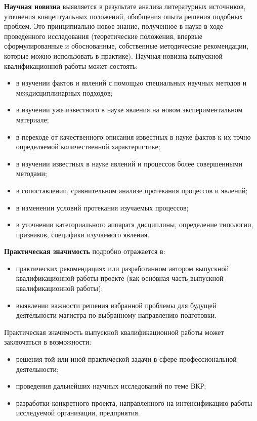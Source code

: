 \textbf{Научная новизна} выявляется в результате анализа литературных источников, уточнения концептуальных положений, обобщения опыта решения подобных проблем. Это принципиально новое знание, полученное в науке в ходе проведенного исследования (теоретические положения, впервые сформулированные и обоснованные, собственные методические рекомендации, которые можно использовать в практике).
Научная новизна выпускной квалификационной работы может состоять: 
\begin{itemize}
	\item в изучении фактов и явлений с помощью специальных научных методов и междисциплинарных подходов;
    \item в изучении уже известного в науке явления на новом экспериментальном материале;
	\item в переходе от качественного описания известных в науке фактов к их точно определяемой количественной характеристике;
	\item в изучении известных в науке явлений и процессов более совершенными методами;
	\item в сопоставлении, сравнительном анализе протекания процессов и явлений;
	\item в изменении условий протекания изучаемых процессов;
	\item в уточнении категориального аппарата дисциплины, определение типологии, признаков, специфики изучаемого явления.
\end{itemize}

\textbf{Практическая значимость} подробно отражается в:
\begin{itemize}
	\item практических рекомендациях или разработанном автором выпускной квалификационной работы проекте (как основная часть выпускной квалификационной работы);
	\item выявлении важности решения избранной проблемы для будущей деятельности магистра по выбранному направлению подготовки.
\end{itemize} 

Практическая значимость выпускной квалификационной работы может заключаться в возможности:

\begin{itemize}
	\item решения той или иной практической задачи в сфере профессиональной деятельности;
	\item проведения дальнейших научных исследований по теме ВКР;
	\item разработки конкретного проекта, направленного на интенсификацию работы исследуемой организации, предприятия.
\end{itemize} 

